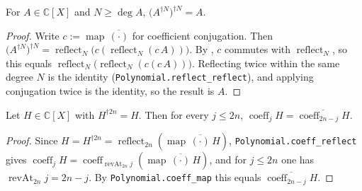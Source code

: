 \begin{lemma}
    \label{lem:conjrecip-involutive}
    \leanok
    For $A \in \mathbb{C}[X]$ and $N \ge \deg A$,
    $\bigl(A^{\dagger N}\bigr)^{\dagger N} = A$.
\end{lemma}
\begin{proof}
    Write $c := \operatorname{map}\,\overline{(\cdot)}$ for coefficient
    conjugation. Then
    $\bigl(A^{\dagger N}\bigr)^{\dagger N}
    = \operatorname{reflect}_N\bigl(c(\operatorname{reflect}_N(c\,A))\bigr)$.
    By , $c$ commutes with $\operatorname{reflect}_N$,
    so this equals
    $\operatorname{reflect}_N\bigl(\operatorname{reflect}_N(c(c\,A))\bigr)$.
    Reflecting twice within the same degree $N$ is the identity
    (\texttt{Polynomial.reflect\_reflect}), and applying conjugation twice is the
    identity, so the result is $A$.
\end{proof}

\begin{lemma}
    \label{lem:selfinversive-coeff-symm}
    \leanok
    Let $H \in \mathbb{C}[X]$ with $H^{\dagger 2n} = H$. Then for every
    $j \le 2n$, $\operatorname{coeff}_j H
    = \overline{\operatorname{coeff}_{2n-j} H}$.
\end{lemma}
\begin{proof}
    Since $H = H^{\dagger 2n}
    = \operatorname{reflect}_{2n}(\operatorname{map}\,\overline{(\cdot)}\,H)$,
    \texttt{Polynomial.coeff\_reflect} gives $\operatorname{coeff}_j H
    = \operatorname{coeff}_{\operatorname{revAt}_{2n} j}
    (\operatorname{map}\,\overline{(\cdot)}\,H)$, and for $j \le 2n$ one has
    $\operatorname{revAt}_{2n} j = 2n - j$. By \texttt{Polynomial.coeff\_map}
    this equals $\overline{\operatorname{coeff}_{2n-j} H}$.
\end{proof}

